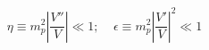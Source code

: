 \begin{equation}
\eta   \equiv   m_p^2 \left | \frac{V''}{V}\right | \ll 1; ~~~~~
\epsilon  \equiv   m_p^2 \left |\frac{V'}{V}\right |^2 \ll 1
\end{equation}

